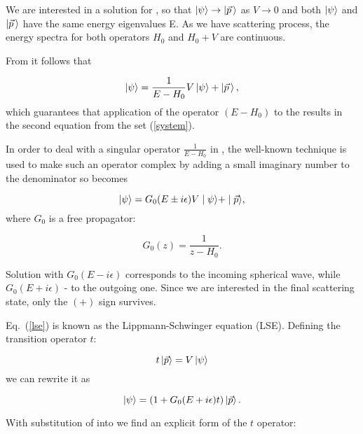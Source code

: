     We are interested in a solution for , so that 
    $\ket{\psi} \rightarrow \ket{\vec{p}\,}$ as $V \rightarrow 0$
    and both $\ket{\psi}$ and $\ket{\vec{p}\,}$ have the same energy eigenvalues E.
    As we have scattering process, the energy spectra for both operators $H_0$ and $H_0 + V$
    are continuous. 

    From  it follows that

    \begin{equation}
        \ket{\psi} = \frac{1}{E - H_0}V \ket{\psi} +  \ket{\vec{p}\,},
        \label{psieq}
    \end{equation}
    which guarantees that
     application of the operator $(E -H_0)$ to the 
     results in the second equation from the set (\ref{system}).


    In order to deal with a singular operator $\frac{1}{E - H_0}$ in , the well-known
    technique is used to make such an operator complex by adding a small imaginary number to the denominator
    so  becomes

    \begin{equation}
        \ket{\psi} = G_0(E \pm i\epsilon)V \mid \psi \rangle +  \mid \vec{p} \rangle,
        \label{lse}
    \end{equation}
    where $G_0$ is a free propagator:

    \begin{equation}
        G_0(z) = \frac{1}{z - H_0}.
        \label{g0}
    \end{equation}

    Solution with $G_0(E - i\epsilon)$ corresponds to the incoming spherical wave,
    while $G_0(E + i\epsilon)$ - to the outgoing one. Since we are interested in the final scattering
    state, only the $(+)$ sign survives.
    
    Eq.~(\ref{lse}) is known as the Lippmann-Schwinger equation (LSE).
    Defining the transition operator $t$:

    \begin{equation}
        t \ket{\vec{p}} = V \ket{\psi}
        \label{t-op}
    \end{equation}
    we can rewrite it as 

    \begin{equation}
        \ket{\psi} = (1 + G_0(E + i\epsilon) t)  \ket {\vec{p}}.
        \label{psi_toper}
    \end{equation}

    With substitution of  into  we find
    an explicit form of the $t$ operator:

